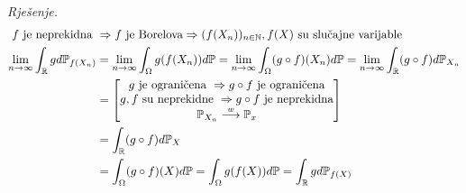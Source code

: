\documentclass{article}
\begin{document}
\textit{Rješenje.} \[\begin{aligned}f\text{ je neprekidna }&\Rightarrow f\text{ je Borelova}\Rightarrow (f(X_n))_{n\in\Bbb N},f(X)\text{ su slučajne varijable}\\\lim_{n\to\infty}\int_\Bbb R gd\Bbb P_{f(X_n)}&=\lim_{n\to\infty}\int_\Omega g(f(X_n))d\Bbb P=\lim_{n\to\infty}\int_\Omega(g\circ f)(X_n)d\Bbb P=\lim_{n\to\infty}\int_\Bbb R(g\circ f)d\Bbb P_{X_n}\\&=\begin{bmatrix}g\text{ je ograničena }\Rightarrow g\circ f\text{ je ograničena}\\g,f\text{ su neprekidne }\Rightarrow g\circ f\text{ je neprekidna}\\\Bbb P_{X_n}\overset{w}{\longrightarrow}\Bbb P_x\end{bmatrix}\\&=\int_\Bbb R(g\circ f)d\Bbb P_X\\&=\int_\Omega(g\circ f)(X)d\Bbb P=\int_\Omega g(f(X))d\Bbb P=\int_\Bbb Rgd\Bbb P_{f(X)}\end{aligned}\]
\newpage
\end{document}
